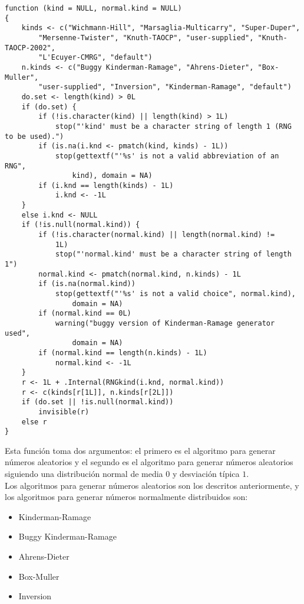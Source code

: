 \documentclass[12pt,a4paper,twoside,openright,titlepage,final]{article}
\begin{document}
\begin{verbatim}
function (kind = NULL, normal.kind = NULL) 
{
    kinds <- c("Wichmann-Hill", "Marsaglia-Multicarry", "Super-Duper", 
        "Mersenne-Twister", "Knuth-TAOCP", "user-supplied", "Knuth-TAOCP-2002", 
        "L'Ecuyer-CMRG", "default")
    n.kinds <- c("Buggy Kinderman-Ramage", "Ahrens-Dieter", "Box-Muller", 
        "user-supplied", "Inversion", "Kinderman-Ramage", "default")
    do.set <- length(kind) > 0L
    if (do.set) {
        if (!is.character(kind) || length(kind) > 1L) 
            stop("'kind' must be a character string of length 1 (RNG to be used).")
        if (is.na(i.knd <- pmatch(kind, kinds) - 1L)) 
            stop(gettextf("'%s' is not a valid abbreviation of an RNG", 
                kind), domain = NA)
        if (i.knd == length(kinds) - 1L) 
            i.knd <- -1L
    }
    else i.knd <- NULL
    if (!is.null(normal.kind)) {
        if (!is.character(normal.kind) || length(normal.kind) != 
            1L) 
            stop("'normal.kind' must be a character string of length 1")
        normal.kind <- pmatch(normal.kind, n.kinds) - 1L
        if (is.na(normal.kind)) 
            stop(gettextf("'%s' is not a valid choice", normal.kind), 
                domain = NA)
        if (normal.kind == 0L) 
            warning("buggy version of Kinderman-Ramage generator used", 
                domain = NA)
        if (normal.kind == length(n.kinds) - 1L) 
            normal.kind <- -1L
    }
    r <- 1L + .Internal(RNGkind(i.knd, normal.kind))
    r <- c(kinds[r[1L]], n.kinds[r[2L]])
    if (do.set || !is.null(normal.kind)) 
        invisible(r)
    else r
}

\end{verbatim}

Esta función toma dos argumentos: el primero es el algoritmo para generar números aleatorios y el segundo es el algoritmo para generar números aleatorios siguiendo una distribución normal de media $0$ y desviación típica $1$.\\

Los algoritmos para generar números aleatorios son los descritos anteriormente, y los algoritmos para generar números normalmente distribuidos son:

\begin{itemize}
\item Kinderman-Ramage
\item Buggy Kinderman-Ramage 
\item Ahrens-Dieter 
\item Box-Muller 
\item Inversion
\end{itemize}
\end{document}
